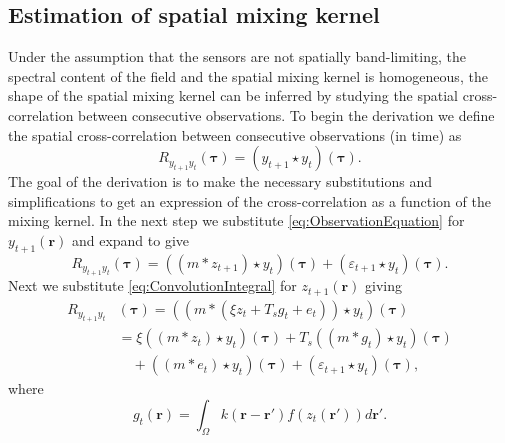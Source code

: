 \documentclass[10pt,twocolumn,twoside]{IEEEtran}
\begin{document}
\subsection{Estimation of spatial mixing kernel} 
Under the assumption that the sensors are not spatially band-limiting, the spectral content of the field and the spatial mixing kernel is homogeneous, the shape of the spatial mixing kernel can be inferred by studying the spatial cross-correlation between consecutive observations.  To begin the derivation we define the spatial cross-correlation between consecutive observations (in time) as  
\begin{equation}
	R_{y_{t+1}y_t}(\boldsymbol{\tau}) = \left(y_{t+1}\star y_t\right)\left(\boldsymbol{\tau}\right).
\end{equation}
 The goal of the derivation is to make the necessary substitutions and simplifications to get an expression of the cross-correlation as a function of the mixing kernel. In the next step we substitute \eqref{eq:ObservationEquation} for $y_{t+1}(\mathbf{r})$ and expand to give
\begin{equation}
	R_{y_{t+1}y_t}\left(\boldsymbol{\tau}\right) = \left(\left(m \ast z_{t+1}\right)\star y_t\right)\left(\boldsymbol{\tau}\right) + \left(\varepsilon_{t+1} \star y_t\right)\left(\boldsymbol{\tau}\right).
\end{equation}
Next we substitute \eqref{eq:ConvolutionIntegral} for $z_{t+1}(\mathbf{r})$ giving 
\begin{align}
	R_{y_{t+1}y_t}&(\boldsymbol{\tau}) = (\left(m \ast \left(\xi z_t +  T_s g_t + e_t\right)\right) \star y_t)(\boldsymbol{\tau}) \nonumber\\
	&= \xi\left(\left(m \ast z_t\right) \star y_t \right)(\boldsymbol{\tau})+ T_s \left(\left(m\ast g_t\right)\star y_t \right)(\boldsymbol{\tau}) \nonumber\\
	&\quad+ \left(\left(m\ast e_t\right)\star y_t \right)(\boldsymbol{\tau})+ (\varepsilon_{t+1} \star y_t)(\boldsymbol{\tau}),
\end{align}
where
\begin{equation}\label{eq:averagefiringrate}
	g_t(\mathbf r)=\int_{\Omega}k\left(\mathbf{r}-\mathbf{r}'\right)f(z_{t}\left(\mathbf{r}'\right))d\mathbf{r}'.
\end{equation}
\end{document}
